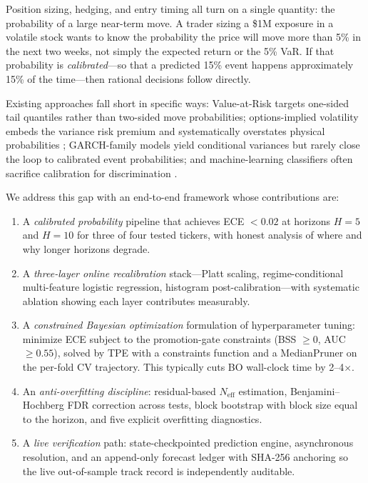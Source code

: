 \documentclass[11pt,a4paper]{article}
\newcommand{\Neff}{N_{\text{eff}}}
\begin{document}
Position sizing, hedging, and entry timing all turn on a single quantity: the probability of a large near-term move. A trader sizing a \$1M exposure in a volatile stock wants to know the probability the price will move more than 5\% in the next two weeks, not simply the expected return or the 5\% VaR. If that probability is \emph{calibrated}---so that a predicted 15\% event happens approximately 15\% of the time---then rational decisions follow directly.

Existing approaches fall short in specific ways:
Value-at-Risk targets one-sided tail quantiles rather than two-sided move probabilities;
options-implied volatility embeds the variance risk premium and systematically overstates physical probabilities \cite{bollerslev2009expected};
GARCH-family models yield conditional variances but rarely close the loop to calibrated event probabilities;
and machine-learning classifiers often sacrifice calibration for discrimination \cite{guo2017calibration}.

We address this gap with an end-to-end framework whose contributions are:
\begin{enumerate}
  \item A \emph{calibrated probability} pipeline that achieves ECE $< 0.02$ at horizons $H\!=\!5$ and $H\!=\!10$ for three of four tested tickers, with honest analysis of where and why longer horizons degrade.
  \item A \emph{three-layer online recalibration} stack---Platt scaling, regime-conditional multi-feature logistic regression, histogram post-calibration---with systematic ablation showing each layer contributes measurably.
  \item A \emph{constrained Bayesian optimization} formulation of hyperparameter tuning: minimize ECE subject to the promotion-gate constraints (BSS $\geq 0$, AUC $\geq 0.55$), solved by TPE with a constraints function and a MedianPruner on the per-fold CV trajectory. This typically cuts BO wall-clock time by 2--4$\times$.
  \item An \emph{anti-overfitting discipline}: residual-based $\Neff$ estimation, Benjamini--Hochberg FDR correction across tests, block bootstrap with block size equal to the horizon, and five explicit overfitting diagnostics.
  \item A \emph{live verification} path: state-checkpointed prediction engine, asynchronous resolution, and an append-only forecast ledger with SHA-256 anchoring so the live out-of-sample track record is independently auditable.
\end{enumerate}
\end{document}
